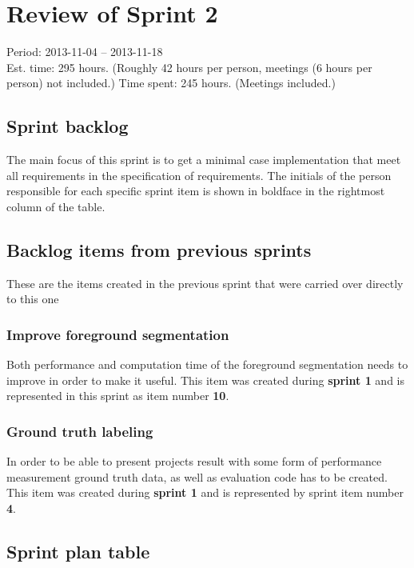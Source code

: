 \section{Review of Sprint 2}
\label{sec:sprint2}
\large Period: 2013-11-04 -- 2013-11-18 \\ 
\large Est. time: 295 hours. (Roughly 42 hours per person, meetings (6 hours per person) not included.)
\large Time spent: 245 hours. (Meetings included.)

\subsection{Sprint backlog}
The main focus of this sprint is to get a minimal case implementation that meet all requirements in the specification of requirements. The initials of the person responsible for each specific sprint item is shown in boldface in the rightmost column of the table.

\subsection{Backlog items from previous sprints}
These are the items created in the previous sprint that were carried over directly to this one

\subsubsection{Improve foreground segmentation}
Both performance and computation time of the foreground segmentation needs to improve in order to make it useful.
This item was created during \textbf{sprint 1} and is represented in this sprint as item number \textbf{10}.

\subsubsection{Ground truth labeling}
In order to be able to present projects result with some form of performance measurement ground truth data, as well as evaluation code has to be created.
This item was created during \textbf{sprint 1} and is represented by sprint item number \textbf{4}. 

\newpage

\subsection{Sprint plan table}

